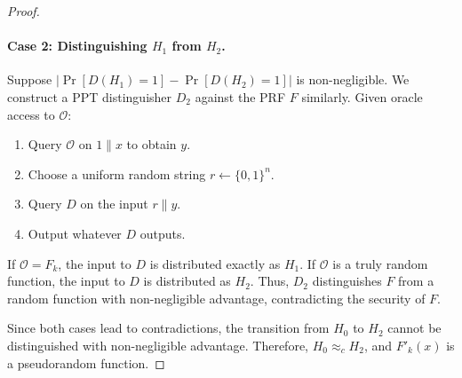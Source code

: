 \documentclass{article}
\begin{document}
\begin{proof}
\paragraph{Case 2: Distinguishing $H_1$ from $H_2$.}
Suppose $| \Pr[D(H_1) = 1] - \Pr[D(H_2) = 1] |$ is non-negligible. We construct a PPT distinguisher $D_2$ against the PRF $F$ similarly. Given oracle access to $\mathcal{O}$:
\begin{enumerate}
    \item Query $\mathcal{O}$ on $1 \parallel x$ to obtain $y$.
    \item Choose a uniform random string $r \leftarrow \{0, 1\}^n$.
    \item Query $D$ on the input $r \parallel y$.
    \item Output whatever $D$ outputs.
\end{enumerate}
If $\mathcal{O} = F_k$, the input to $D$ is distributed exactly as $H_1$. If $\mathcal{O}$ is a truly random function, the input to $D$ is distributed as $H_2$. Thus, $D_2$ distinguishes $F$ from a random function with non-negligible advantage, contradicting the security of $F$.

Since both cases lead to contradictions, the transition from $H_0$ to $H_2$ cannot be distinguished with non-negligible advantage. Therefore, $H_0 \approx_c H_2$, and $F'_k(x)$ is a pseudorandom function.
\end{proof}
\end{document}
